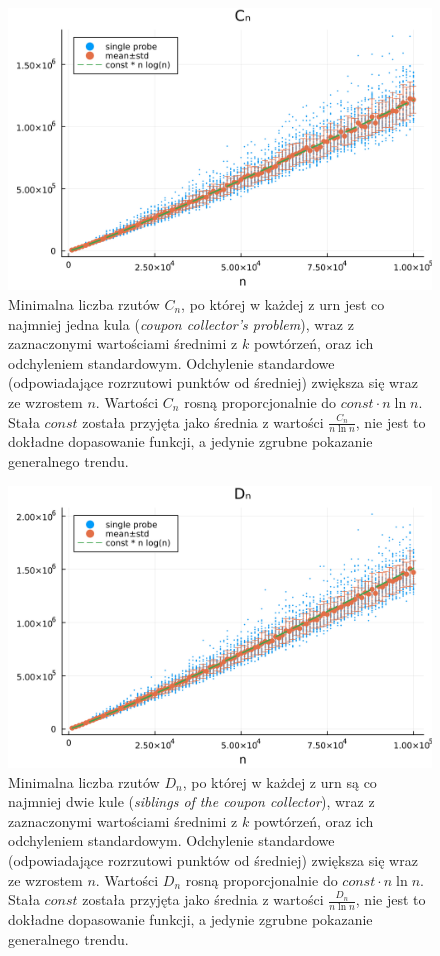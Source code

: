 \documentclass{article}
\begin{document}
\begin{figure}
    \centering
    \includegraphics[width=1.0\textwidth]{../results/C_n.png}
    \caption{Minimalna liczba rzutów $C_n$, po której w każdej z urn jest co najmniej jedna kula (\textit{coupon collector's problem}), wraz z zaznaczonymi wartościami średnimi z $k$ powtórzeń, oraz ich odchyleniem standardowym. Odchylenie standardowe (odpowiadające rozrzutowi punktów od średniej) zwiększa się wraz ze wzrostem $n$.
        Wartości $C_n$ rosną proporcjonalnie do $const \cdot n \ln n$. Stała $const$ została przyjęta jako średnia z wartości $\frac{C_n}{n \ln n}$, nie jest to dokładne dopasowanie funkcji, a jedynie zgrubne pokazanie generalnego trendu.}
    \label{fig:C_n}
\end{figure}

\begin{figure}
    \centering
    \includegraphics[width=1.0\textwidth]{../results/D_n.png}
    \caption{Minimalna liczba rzutów $D_n$, po której w każdej z urn są co najmniej dwie kule (\textit{siblings of the coupon collector}), wraz z zaznaczonymi wartościami średnimi z $k$ powtórzeń, oraz ich odchyleniem standardowym. Odchylenie standardowe (odpowiadające rozrzutowi punktów od średniej) zwiększa się wraz ze wzrostem $n$.
        Wartości $D_n$ rosną proporcjonalnie do $const \cdot n \ln n$. Stała $const$ została przyjęta jako średnia z wartości $\frac{D_n}{n \ln n}$, nie jest to dokładne dopasowanie funkcji, a jedynie zgrubne pokazanie generalnego trendu.}
    \label{fig:D_n}
\end{figure}
\end{document}
